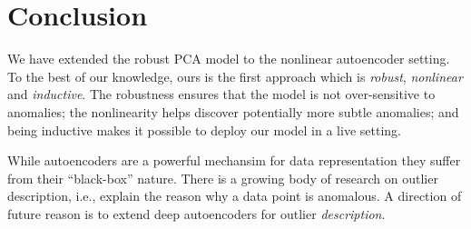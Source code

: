 \section{Conclusion}
\label{sec:conclusion}

We have extended the robust PCA model to the nonlinear autoencoder setting.
To the best of our knowledge, ours is the first approach which is \emph{robust}, \emph{nonlinear} and \emph{inductive}.
The robustness ensures that the model is not over-sensitive
to anomalies;
the nonlinearity helps discover potentially more
subtle anomalies;
and being inductive makes it possible
to deploy our model in a live setting.

While autoencoders are a powerful mechansim for data representation
they suffer from their ``black-box'' nature. There is a growing
body of research on outlier description, i.e., explain the reason
why a data point is anomalous. A direction of future reason is
to extend deep autoencoders for outlier \emph{description}.

